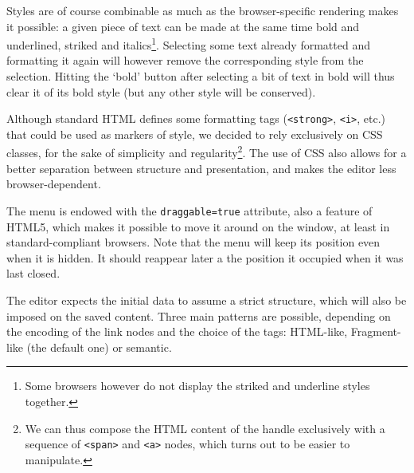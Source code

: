 \documentclass[11pt,a4paper]{article}
\begin{document}
Styles are of course combinable as much as the browser-specific rendering makes it possible: a given piece of text can be made at the same time bold and underlined, striked and italics\footnote{Some browsers however do not display the striked and underline styles together.}. Selecting some text already formatted and formatting it again will however remove the corresponding style from the selection. Hitting the `bold' button after selecting a bit of text in bold will thus clear it of its bold style (but any other style will be conserved).


Although standard HTML defines some formatting tags (\texttt{<strong>}, \texttt{<i>}, etc.) that could be used as markers of style, we decided to rely exclusively on CSS classes, for the sake of simplicity and regularity\footnote{We can thus compose the HTML content of the handle exclusively with a sequence of \texttt{<span>} and \texttt{<a>} nodes, which turns out to be easier to manipulate.}. The use of CSS also allows for a better separation between structure and presentation, and makes the editor less browser-dependent. 

The menu is endowed with the \texttt{draggable=true} attribute, also a feature of HTML5, which makes it possible to move it around on the window, at least in standard-compliant browsers. Note that the menu will keep its position even when it is hidden. It should reappear later a the position it occupied when it was last closed.


The editor expects the initial data to assume a strict structure, which will also be imposed on the saved content. Three main patterns are possible, depending on the encoding of the link nodes and the choice of the tags: HTML-like, Fragment-like (the default one) or semantic.  
\end{document}
